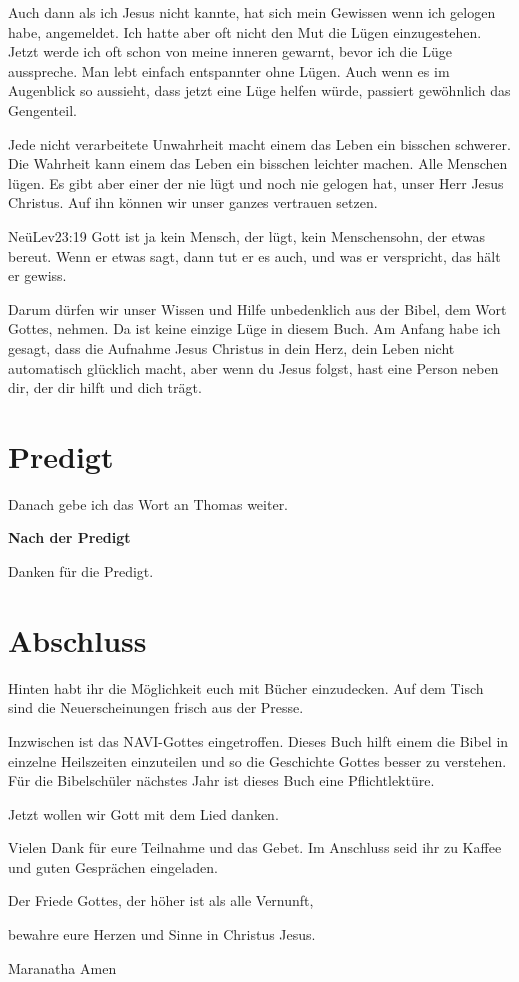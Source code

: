\documentclass{../inc/mybib}
\begin{document}
\begin{spacing}{1.5}
Auch dann als ich Jesus nicht kannte, hat sich mein Gewissen wenn ich gelogen habe, angemeldet. Ich hatte aber oft nicht den Mut die Lügen einzugestehen. Jetzt werde ich oft schon von meine inneren gewarnt, bevor ich die Lüge ausspreche. Man lebt einfach entspannter ohne Lügen. Auch wenn es im Augenblick so aussieht, dass jetzt eine Lüge helfen würde, passiert gewöhnlich das Gengenteil.

Jede nicht verarbeitete Unwahrheit macht einem das Leben ein bisschen schwerer. Die Wahrheit kann einem das Leben ein bisschen leichter machen.
Alle Menschen lügen. Es gibt aber einer der nie lügt und noch nie gelogen hat, unser Herr Jesus Christus. Auf ihn können wir unser ganzes vertrauen setzen.
\begin{bibeltext}{Neü}{Lev}{23:19}
Gott ist ja kein Mensch, der lügt, kein Menschensohn, der etwas bereut. Wenn er etwas sagt, dann tut er es auch, und was er verspricht, das hält er gewiss.
\end{bibeltext}
Darum dürfen wir unser Wissen und Hilfe unbedenklich aus der Bibel, dem Wort Gottes, nehmen. Da ist keine einzige Lüge in diesem Buch.
Am Anfang habe ich gesagt, dass die Aufnahme Jesus Christus in dein Herz, dein Leben nicht automatisch glücklich macht, aber wenn du Jesus folgst, hast eine Person neben dir, der dir hilft und dich trägt.

\end{spacing}


\section{Predigt}

Danach gebe ich das Wort an Thomas weiter.

\textbf{Nach der Predigt}

Danken für die Predigt.


\section{Abschluss}
Hinten habt ihr die Möglichkeit euch mit Bücher einzudecken. Auf dem Tisch sind die Neuerscheinungen frisch aus der Presse.

Inzwischen ist das NAVI-Gottes eingetroffen. Dieses Buch hilft einem die Bibel in einzelne Heilszeiten einzuteilen und so die Geschichte Gottes besser zu verstehen. Für die Bibelschüler nächstes Jahr ist dieses Buch eine Pflichtlektüre.

Jetzt wollen wir Gott mit dem Lied  danken.

Vielen Dank für eure Teilnahme und das Gebet. Im Anschluss seid ihr zu Kaffee und guten Gesprächen eingeladen.
\beten{} 


Der Friede Gottes, der höher ist als alle Vernunft,

bewahre eure Herzen und Sinne in Christus Jesus.

Maranatha Amen
\end{document}
